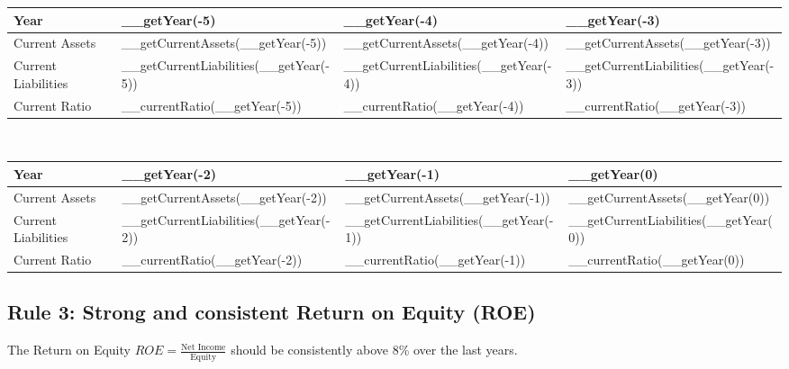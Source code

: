 \begin{tabularx}{\textwidth}{|X|X|X|X|}
 \hline
 Year                               & __getYear(-5)                          & __getYear(-4)                          & __getYear(-3)                          \\
 \hline
 Current Assets                     & __getCurrentAssets(__getYear(-5))      & __getCurrentAssets(__getYear(-4))      & __getCurrentAssets(__getYear(-3))      \\
 Current Liabilities                & __getCurrentLiabilities(__getYear(-5)) & __getCurrentLiabilities(__getYear(-4)) & __getCurrentLiabilities(__getYear(-3)) \\
 \rowcolor{lightgray} Current Ratio & __currentRatio(__getYear(-5))          & __currentRatio(__getYear(-4))          & __currentRatio(__getYear(-3))          \\
 \hline
\end{tabularx}\\

\begin{tabularx}{\textwidth}{|X|X|X|X|}
 \hline
 Year                               & __getYear(-2)                          & __getYear(-1)                          & __getYear(0)                          \\
 \hline
 Current Assets                     & __getCurrentAssets(__getYear(-2))      & __getCurrentAssets(__getYear(-1))      & __getCurrentAssets(__getYear(0))      \\
 Current Liabilities                & __getCurrentLiabilities(__getYear(-2)) & __getCurrentLiabilities(__getYear(-1)) & __getCurrentLiabilities(__getYear(0)) \\
 \rowcolor{lightgray} Current Ratio & __currentRatio(__getYear(-2))          & __currentRatio(__getYear(-1))          & __currentRatio(__getYear(0))          \\
 \hline
\end{tabularx}

\subsection{Rule 3: Strong and consistent Return on Equity (ROE)}

The Return on Equity $ROE = \frac{\text{Net Income}}{\text{Equity}}$ should be
consistently above 8\% over the last years.\\

